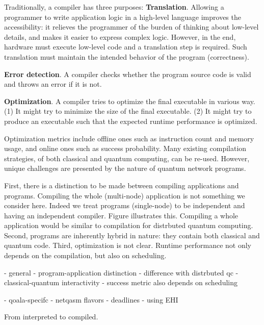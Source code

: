 Traditionally, a compiler has three purposes:
\textbf{Translation}. Allowing a programmer to write application logic in a high-level language improves the accessibility: it relieves the programmer of the burden of thinking about low-level details, and makes it easier to express complex logic. However, in the end, hardware must execute low-level code and a translation step is required. Such translation must maintain the intended behavior of the program (correctness).

\textbf{Error detection}. A compiler checks whether the program source code is valid and throws an error if it is not.

\textbf{Optimization}. A compiler tries to optimize the final executable in various way. (1) It might try to minimize the size of the final executable. (2) It might try to produce an executable such that the expected runtime performance is optimized.


Optimization metrics include offline ones such as instruction count and memory usage, and online ones such as success probability.
Many existing compilation strategies, of both classical and quantum computing, can be re-used.
However, unique challenges are presented by the nature of quantum network programs.

First, there is a distinction to be made between compiling applications and programs.
Compiling the whole (multi-node) application is not something we consider here.
Indeed we treat programs (single-node) to be independent and having an independent compiler.
Figure  illustrates this.
Compiling a whole application would be similar to compilation for distrbuted quantum computing.
Second, programs are inherently hybrid in nature: they contain both classical and quantum code.
Third, optimization is not clear.
Runtime performance not only depends on the compilation, but also on scheduling.

- general
  - program-application distinction
  - difference with distrbuted qc
  - classical-quantum interactivity
  - success metric also depends on scheduling

- qoala-specifc
  - netqasm flavors
  - deadlines
  - using EHI

From interpreted to compiled.


